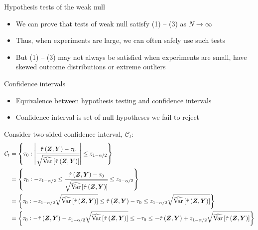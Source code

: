 \documentclass[table, xcolor = {dvipsnames}, 9pt]{beamer}
\theoremstyle{plain}
\DeclareMathOperator{\Var}{\rm{Var}}
\begin{document}
\begin{frame}{Hypothesis tests of the weak null}
\vfill
\begin{itemize} \vfill
\item We can prove that tests of weak null satisfy (1) -- (3) as $N \to \infty$ \vfill 
\item Thus, when experiments are large, we can often safely use such tests \vfill
\item But (1) -- (3) may not always be satisfied when experiments are small, have skewed outcome distributions or extreme outliers \vfill
\end{itemize}
\end{frame}
\begin{frame}{Confidence intervals}
\vfill
\begin{itemize} \vfill
\item Equivalence between hypothesis testing and confidence intervals
\item Confidence interval is set of null hypotheses we fail to reject
\end{itemize}
Consider two-sided confidence interval, $\mathcal{C}_t$:
\footnotesize
\begin{equation*}
\begin{split}
\mathcal{C}_t & = \left\{\tau_0 : \left\lvert \cfrac{\hat{\tau}\left(\bm{Z}, \bm{Y}\right)- \tau_0}{\sqrt{\widehat{\Var}\left[\hat{\tau}\left(\bm{Z}, \bm{Y}\right)\right]}} \right\rvert \leq z_{1 - \alpha/2}\right\} \\ 
& = \left\{\tau_0 : - z_{1 - \alpha/2} \leq \cfrac{\hat{\tau}\left(\bm{Z}, \bm{Y}\right)- \tau_0}{\sqrt{\widehat{\Var}\left[\hat{\tau}\left(\bm{Z}, \bm{Y}\right)\right]}} \leq z_{1 - \alpha/2} \right\} \\ 
& = \left\{\tau_0 : - z_{1 - \alpha/2} \sqrt{\widehat{\Var}\left[\hat{\tau}\left(\bm{Z}, \bm{Y}\right)\right] }\leq \hat{\tau}\left(\bm{Z}, \bm{Y}\right)- \tau_0 \leq z_{1 - \alpha/2} \sqrt{\widehat{\Var}\left[\hat{\tau}\left(\bm{Z}, \bm{Y}\right)\right] }\right\} \\ 
& = \left\{\tau_0 : -\hat{\tau}\left(\bm{Z}, \bm{Y}\right)- z_{1 - \alpha/2} \sqrt{\widehat{\Var}\left[\hat{\tau}\left(\bm{Z}, \bm{Y}\right)\right] }\leq - \tau_0 \leq - \hat{\tau}\left(\bm{Z}, \bm{Y}\right)+ z_{1 - \alpha/2} \sqrt{\widehat{\Var}\left[\hat{\tau}\left(\bm{Z}, \bm{Y}\right)\right] }\right\} \\ 

\end{split}
\end{equation*}
\end{frame}
\end{document}
